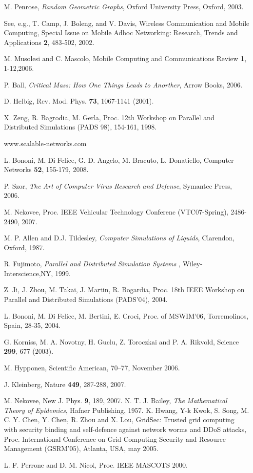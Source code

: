 \documentclass{elsart}
\begin{document}
\begin{thebibliography}{40}
M. Penrose, {\it Random Geometric Graphs}, Oxford University Press,
Oxford, 2003.

See, e.g., T. Camp, J. Boleng, and V. Davis, Wireless Communication and Mobile Computing,
Special Issue on Mobile Adhoc Networking: Research, Trends and Applications
{\bf 2}, 483-502, 2002.


M. Musolesi and C. Mascolo, Mobile Computing and Communications Review {\bf 1}, 
1-12,2006. 

 P. Ball, {\it Critical Mass: How One Things Leads to 
Anorther}, Arrow Books, 2006.

D. Helbig, Rev. Mod. Phys. {\bf 73}, 1067-1141 (2001).

X. Zeng, R. Bagrodia, M. Gerla, Proc. 12th Workshop on Parallel and 
Distributed Simulations (PADS 98), 154-161, 1998.

www.scalable-networks.com

L. Bononi, M. Di Felice, G. D. Angelo, M. Bracuto, L. Donatiello, 
Computer Networks {\bf 52}, 155-179, 2008.

P. Szor, {\it The Art of Computer Virus Research and Defense}, Symantec Press, 2006. 

M. Nekovee, Proc. IEEE Vehicular Technology Conferenc (VTC07-Spring),
2486-2490, 2007. 

M. P. Allen and D.J. Tildesley, {\it Computer Simulations of Liquids}, 
Clarendon, Oxford, 1987.

R. Fujimoto, {\it Parallel and Distributed Simulation Systems
}, Wiley-Interscience,NY, 1999. 

Z. Ji, J. Zhou, M. Takai, J. Martin, R. Bogardia, Proc. 18th IEEE Workshop on 
Parallel and Distributed Simulations (PADS'04), 2004.

L. Bononi, M. Di Felice, M. Bertini, E. Croci, Proc. of MSWIM'06, 
Torremolinos, Spain, 28-35, 2004.

 G. Korniss, M. A. Novotny, H. Guclu, Z. Toroczkai and P. A. 
Rikvold, Science {\bf 299}, 677 (2003).


M. Hypponen, Scientific American, 70--77, November 2006.

J. Kleinberg, Nature {\bf 449}, 287-288, 2007.

M. Nekovee, New J. Phys. {\bf 9}, 189, 2007. 
N. T. J. Bailey, {\it The Mathematical Theory of Epidemics},
Hafner Publishing, 1957.
K. Hwang, Y-k Kwok, S. Song, M. C. Y. Chen, Y. Chen, R. Zhou and X. Lou,
GridSec: Trusted grid computing with security binding and self-defence against network worms and DDoS attacks, Proc. International Conference on Grid Computing Security and Resource  Management (GSRM'05), Atlanta, USA, may 2005.

L. F. Perrone and D. M. Nicol, Proc. IEEE MASCOTS 2000.
\end{thebibliography}
\end{document}
